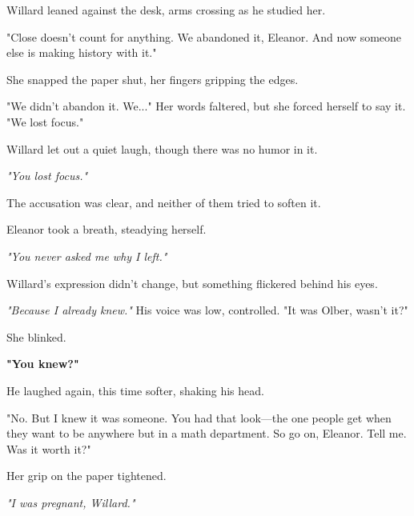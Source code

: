 Willard leaned against the desk, arms crossing as he studied her.

\smallskip

"Close doesn’t count for anything. We abandoned it, Eleanor. And now someone else is making history with it."

\smallskip

She snapped the paper shut, her fingers gripping the edges.

\smallskip

"We didn’t abandon it. We..." Her words faltered, but she forced herself to say it. "We lost focus."

\smallskip

Willard let out a quiet laugh, though there was no humor in it.

\smallskip

\textit{"You lost focus."}

\smallskip

The accusation was clear, and neither of them tried to soften it.

\smallskip

Eleanor took a breath, steadying herself.

\smallskip

\textit{"You never asked me why I left."}

\smallskip

\noindent
Willard’s expression didn’t change, but something flickered behind his eyes.

\smallskip

\textit{"Because I already knew."} His voice was low, controlled. "It was Olber, wasn’t it?"

\smallskip

She blinked.

\smallskip

\textbf{"You knew?"}

\smallskip

He laughed again, this time softer, shaking his head.

\smallskip

"No. But I knew it was someone. You had that look—the one people get when they want to be anywhere but in a math department. So go on, Eleanor. Tell me. Was it worth it?"

\smallskip

Her grip on the paper tightened.

\smallskip

\textit{"I was pregnant, Willard."}

